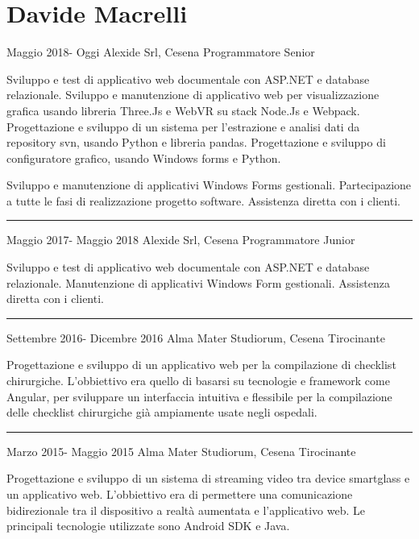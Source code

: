 \documentclass{tccv}
\begin{document}
\part{Davide Macrelli}

\begin{eventlist}

\item{Maggio 2018- Oggi}
     {Alexide Srl, Cesena}
     {Programmatore Senior}

Sviluppo e test di applicativo web documentale con ASP.NET e database relazionale. Sviluppo e manutenzione di applicativo web per visualizzazione grafica usando libreria Three.Js e WebVR su stack Node.Js e Webpack. Progettazione e sviluppo di  un sistema per l'estrazione e analisi dati da repository svn, usando Python e libreria pandas. Progettazione e sviluppo di configuratore grafico, usando Windows forms e Python.

Sviluppo e manutenzione di applicativi Windows Forms gestionali. Partecipazione a tutte le fasi di realizzazione progetto software. Assistenza diretta con i clienti.

\noindent\hfil\rule{0.3\textwidth}{.4pt}

\item{Maggio 2017- Maggio 2018}
     {Alexide Srl, Cesena}
     {Programmatore Junior}

Sviluppo e test di applicativo web documentale con ASP.NET e database relazionale. Manutenzione di applicativi Windows Form gestionali. 
Assistenza diretta con i clienti.

\noindent\hfil\rule{0.3\textwidth}{.4pt}

\item{Settembre 2016- Dicembre 2016}
     {Alma Mater Studiorum, Cesena}
     {Tirocinante}

Progettazione e sviluppo di un applicativo web per la compilazione di checklist chirurgiche. L'obbiettivo era quello di basarsi su tecnologie e framework come Angular, per sviluppare un interfaccia intuitiva e flessibile per la compilazione delle checklist chirurgiche già ampiamente usate negli ospedali.

\noindent\hfil\rule{0.3\textwidth}{.4pt}

\item{Marzo 2015- Maggio 2015}
     {Alma Mater Studiorum, Cesena}
     {Tirocinante}

Progettazione e sviluppo di un sistema di streaming video tra device smartglass e un applicativo web. L'obbiettivo era di permettere una comunicazione bidirezionale tra il dispositivo a realtà aumentata e l'applicativo web. Le principali tecnologie utilizzate sono Android SDK e Java.



\end{eventlist}
\end{document}
